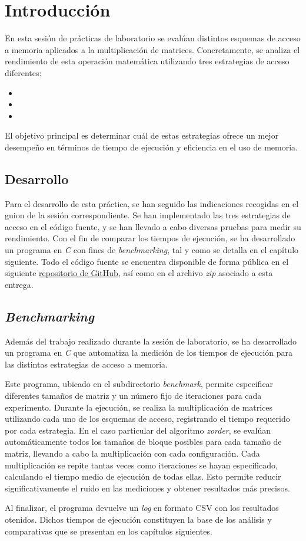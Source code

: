 \pagestyle{fancy}
\fancyhead[l]{\autorUO}
\fancyfoot[l]{\asignaturaAbbr}
\fancyfoot[r]{\fecha}

\section{Introducción}
En esta sesión de prácticas de laboratorio se evalúan distintos esquemas de acceso a memoria aplicados a la multiplicación de matrices.
Concretamente, se analiza el rendimiento de esta operación matemática utilizando tres estrategias de acceso diferentes:

\begin{itemize}
    \item \rowmajor
    \item \colmajor
    \item \zorder
\end{itemize}
El objetivo principal es determinar cuál de estas estrategias ofrece un mejor desempeño en términos de tiempo de ejecución y 
eficiencia en el uso de memoria.

\subsection{Desarrollo}
Para el desarrollo de esta práctica, se han seguido las indicaciones recogidas en el guion de la sesión correspondiente. 
Se han implementado las tres estrategias de acceso en el código fuente, y se han llevado a cabo diversas pruebas para medir su rendimiento.
Con el fin de comparar los tiempos de ejecución, se ha desarrollado un programa en \textit{C} con fines de \textit{benchmarking}, 
tal y como se detalla en el capítulo siguiente. Todo el código fuente se encuentra disponible de forma pública en el siguiente 
\href{https://github.com/rubennmg/CAP/tree/main/sesion1}{repositorio de GitHub}, así como en el archivo \textit{zip} asociado a esta entrega.

\subsection{\textit{Benchmarking}}
Además del trabajo realizado durante la sesión de laboratorio, se ha desarrollado un programa en \textit{C} que automatiza la medición 
de los tiempos de ejecución para las distintas estrategias de acceso a memoria. 

Este programa, ubicado en el subdirectorio \textit{benchmark}, permite especificar diferentes tamaños de matriz y un número fijo de iteraciones para cada experimento.
Durante la ejecución, se realiza la multiplicación de matrices utilizando cada uno de los esquemas de acceso, registrando el 
tiempo requerido por cada estrategia. En el caso particular del algoritmo \textit{zorder}, se evalúan automáticamente todos los tamaños 
de bloque posibles para cada tamaño de matriz, llevando a cabo la multiplicación con cada configuración.
Cada multiplicación se repite tantas veces como iteraciones se hayan especificado, calculando el tiempo medio de ejecución de todas ellas. 
Esto permite reducir significativamente el ruido en las mediciones y obtener resultados más precisos.

Al finalizar, el programa devuelve un \textit{log} en formato CSV con los resultados otenidos. 
Dichos tiempos de ejecución constituyen la base de los análisis y comparativas que se presentan en los capítulos siguientes.